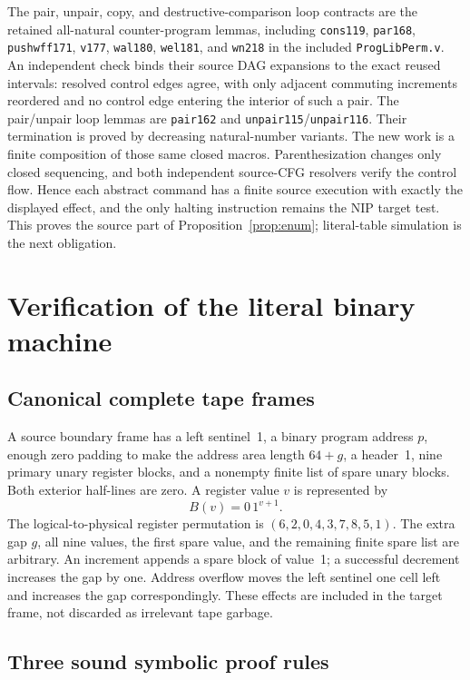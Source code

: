 \documentclass[11pt]{article}
\theoremstyle{definition}\newtheorem{definition}[theorem]{Definition}
\begin{document}
The pair, unpair, copy, and destructive-comparison loop contracts are the
retained all-natural counter-program lemmas, including
\texttt{cons119}, \texttt{par168}, \texttt{pushwff171}, \texttt{v177},
\texttt{wal180}, \texttt{wel181}, and \texttt{wn218} in the included
\texttt{ProgLibPerm.v}. An independent check binds their source DAG
expansions to the exact reused intervals: resolved control edges agree,
with only adjacent commuting increments reordered and no control edge
entering the interior of such a pair. The pair/unpair loop lemmas are
\texttt{pair162} and \texttt{unpair115}/\texttt{unpair116}.
Their termination is proved by decreasing natural-number variants.
The new work is a finite
composition of those same closed macros. Parenthesization changes only
closed sequencing, and both independent source-CFG resolvers verify the
control flow. Hence each abstract command has a finite source execution
with exactly the displayed effect, and the only halting instruction remains
the NIP target test. This proves the source part of
Proposition~\ref{prop:enum}; literal-table simulation is the next obligation.

\section{Verification of the literal binary machine}

\subsection{Canonical complete tape frames}

A source boundary frame has a left sentinel~1, a binary program address
$p$, enough zero padding to make the address area length $64+g$, a
header~1, nine primary unary register blocks, and a nonempty finite list
of spare unary blocks. Both exterior half-lines are zero.
A register value $v$ is represented by
\[
 B(v)=0\,1^{v+1}.
\]
The logical-to-physical register permutation is
$(6,2,0,4,3,7,8,5,1)$. The extra gap $g$, all nine values, the first
spare value, and the remaining finite spare list are arbitrary.
An increment appends a spare block of value~1; a successful decrement
increases the gap by one. Address overflow moves the left sentinel one
cell left and increases the gap correspondingly. These effects are
included in the target frame, not discarded as irrelevant tape garbage.

\subsection{Three sound symbolic proof rules}
\end{document}
